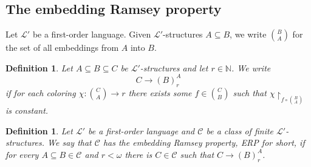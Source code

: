 \documentclass{amsart}
\newtheorem{defin}[teor]{Definition}
\newtheorem{external claim}[teor]{Claim}
\newcommand{\C}{{\mathfrak C}}
\newcommand{\mL}{\mathcal{L}}
\DeclareMathOperator{\tp}{{tp}}
\begin{document}
 \subsection{The embedding Ramsey property}
Let $\mL'$ be a first-order language. Given $\mL'$-structures $A\subseteq B$, we write $\binom{B}{A}$ for the set of all embeddings from $A$ into $B$.   
\begin{defin}
    Let $A\subseteq B \subseteq C$ be $\mL'$-structures and let $r\in\mathbb{N}$. We write $$ C\to (B)^A_r$$ if for each coloring $\chi: \binom{C}{A}\to r$ there exists some $f\in \binom{C}{B}$ such that $\chi\upharpoonright_{f\circ \binom{B}{A}}$ is constant.
\end{defin}

\begin{defin}
    Let $\mL'$ be a first-order language and $\mathcal{C}$ be a class of finite $\mL'$-structures. We say that $\mathcal{C}$ has the \emph{embedding Ramsey property}, \emph{ERP} for short, if for every $A\subseteq B \in \mathcal{C}$ and $r<\omega$ there is $C\in \mathcal{C}$ such that $C\to (B)^A_r$.
\end{defin}
\end{document}
